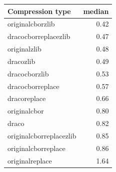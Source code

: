 \begin{table}[!h]
\begin{minipage}{.5\linewidth}
\begin{tabular}{|l|r|}
\hline
Compression type & median\\
\hline
originalcborzlib & 0.42\\
\hline
dracocborreplacezlib & 0.47\\
\hline
originalzlib & 0.48\\
\hline
dracozlib & 0.49\\
\hline
dracocborzlib & 0.53\\
\hline
dracocborreplace & 0.57\\
\hline
dracoreplace & 0.66\\
\hline
originalcbor & 0.80\\
\hline
draco & 0.82\\
\hline
originalcborreplacezlib & 0.85\\
\hline
originalcborreplace & 0.86\\
\hline
originalreplace & 1.64\\
\hline
\end{tabular}
\end{minipage} 
\end{table}
